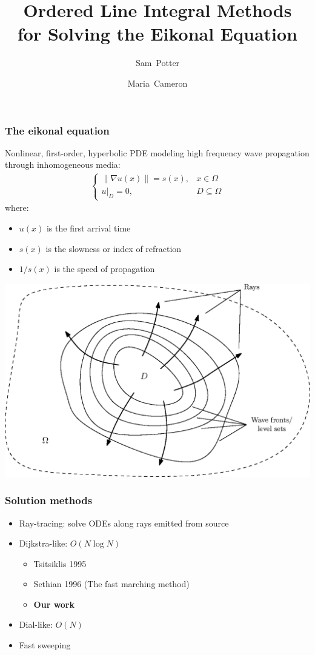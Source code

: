 \documentclass{beamer}
\begin{document}
\title[OLIM for Eikonal]{Ordered Line Integral Methods \\
  for Solving the Eikonal Equation}
\author{Sam~Potter \and Maria~Cameron}

\frame{\titlepage}

\begin{frame}
  \frametitle{The eikonal equation} Nonlinear, first-order, hyperbolic
  PDE modeling high frequency wave propagation through inhomogeneous
  media:
  \begin{align*}
    \begin{cases}
      \|\nabla u(x)\| = s(x), & x \in \Omega \\
      \left. u \right|_{D} = 0, & D \subseteq \Omega
    \end{cases}
  \end{align*}
  where:
  \begin{itemize}
  \item $u(x)$ is the first arrival time
  \item $s(x)$ is the slowness or index of refraction
  \item $1/s(x)$ is the speed of propagation
  \end{itemize}
\end{frame}

\begin{frame}
  \includegraphics[width=\linewidth]{level-sets.eps}
\end{frame}

\begin{frame}
  \frametitle{Solution methods}
  \begin{itemize}
  \item Ray-tracing: solve ODEs along rays emitted from source\pause
  \item Dijkstra-like: $O(N \log N)$ \pause
    \begin{itemize}
    \item Tsitsiklis 1995\pause
    \item Sethian 1996 (The fast marching method) \pause
    \item \textbf{Our work}\pause
    \end{itemize}
  \item Dial-like: $O(N)$ \pause
  \item Fast sweeping
  \end{itemize}    
\end{frame}
\end{document}
